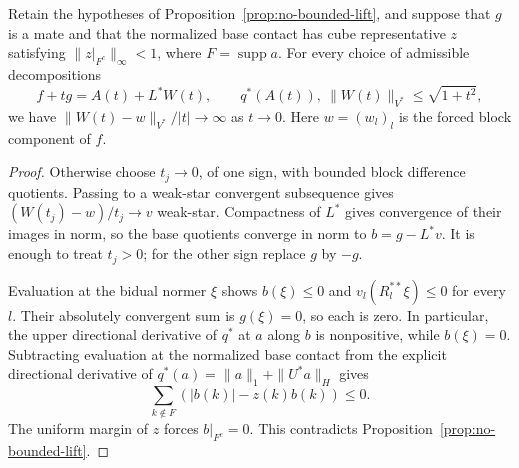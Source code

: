 \documentclass[10pt]{amsart}
\newcommand{\supp}{\operatorname{supp}}
\begin{document}
\begin{proposition}
\label{prop:lift-blowup}
Retain the hypotheses of Proposition~\ref{prop:no-bounded-lift},
and suppose that $g$ is a mate and that the normalized base
contact has cube representative $z$ satisfying
$\|z|_{F^c}\|_\infty<1$, where $F=\supp a$.
For every choice of admissible decompositions
\[
 f+tg=A(t)+L^*W(t),\qquad
 q^*(A(t)),\ \|W(t)\|_{V^*}\le\sqrt{1+t^2},
\]
we have $\|W(t)-w\|_{V^*}/|t|\to\infty$ as $t\to0$.
Here $w=(w_l)_l$ is the forced block component of $f$.
\end{proposition}
\begin{proof}
Otherwise choose $t_j\to0$, of one sign, with bounded block
difference quotients. Passing to a weak-star convergent
subsequence gives $(W(t_j)-w)/t_j\to v$ weak-star.
Compactness of $L^*$ gives convergence of their images in norm,
so the base quotients converge in norm to $b=g-L^*v$.
It is enough to treat $t_j>0$; for the other sign replace
$g$ by $-g$.

Evaluation at the bidual normer $\xi$ shows
$b(\xi)\le0$ and $v_l(R_l^{**}\xi)\le0$ for every $l$.
Their absolutely convergent sum is $g(\xi)=0$, so each is
zero. In particular, the upper directional derivative of
$q^*$ at $a$ along $b$ is nonpositive, while $b(\xi)=0$.
Subtracting evaluation at the normalized base contact from
the explicit directional derivative of
$q^*(a)=\|a\|_1+\|U^*a\|_H$ gives
\[
 \sum_{k\notin F}(|b(k)|-z(k)b(k))\le0.
\]
The uniform margin of $z$ forces $b|_{F^c}=0$.
This contradicts Proposition~\ref{prop:no-bounded-lift}.
\end{proof}
\end{document}
